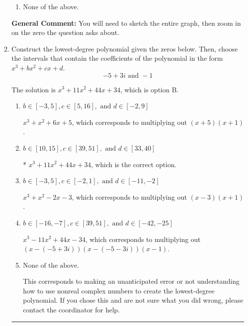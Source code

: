 \documentclass{extbook}[14pt]
\newcommand{\litem}[1]{\item #1

\rule{\textwidth}{0.4pt}}
\begin{document}
\begin{enumerate}
{\begin{enumerate}[label=\Alph*.]
\item None of the above.\end{enumerate}
\textbf{General Comment:} You will need to sketch the entire graph, then zoom in on the zero the question asks about.
}
\litem{
Construct the lowest-degree polynomial given the zeros below. Then, choose the intervals that contain the coefficients of the polynomial in the form $x^3+bx^2+cx+d$.
\[ -5 + 3 i \text{ and } -1 \]

The solution is \( x^{3} +11 x^{2} +44 x + 34 \), which is option B.\begin{enumerate}[label=\Alph*.]
\item \( b \in [-3, 5], c \in [5, 16], \text{ and } d \in [-2, 9] \)

$x^{3} + x^{2} +6 x + 5$, which corresponds to multiplying out $(x + 5)(x + 1)$.
\item \( b \in [10, 15], c \in [39, 51], \text{ and } d \in [33, 40] \)

* $x^{3} +11 x^{2} +44 x + 34$, which is the correct option.
\item \( b \in [-3, 5], c \in [-2, 1], \text{ and } d \in [-11, -2] \)

$x^{3} + x^{2} -2 x -3$, which corresponds to multiplying out $(x -3)(x + 1)$.
\item \( b \in [-16, -7], c \in [39, 51], \text{ and } d \in [-42, -25] \)

$x^{3} -11 x^{2} +44 x -34$, which corresponds to multiplying out $(x-(-5 + 3 i))(x-(-5 - 3 i))(x -1)$.
\item \( \text{None of the above.} \)

This corresponds to making an unanticipated error or not understanding how to use nonreal complex numbers to create the lowest-degree polynomial. If you chose this and are not sure what you did wrong, please contact the coordinator for help.
\end{enumerate}

}
\end{enumerate}
\end{document}

